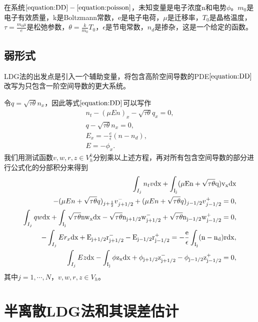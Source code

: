 \documentclass[lang=cn,newtx,10pt,scheme=chinese]{elegantbook}
\begin{document}
在系统$\ref{equation:DD}-\ref{equation:poisson}$，未知变量是电子浓度n和电势$\phi$。$m_0$是电子有效质量，k是Boltzmann常数，e是电子电荷，$\mu$是迁移率，$T_0$是晶格温度，$\tau = \frac{m_0 \mu}{e}$是松弛参数，$\theta = \frac{k}{m_0}T_0$，$\epsilon$是节电常数，$n_d$是掺杂，这是一个给定的函数。
\section{弱形式}
LDG法的出发点是引入一个辅助变量，将包含高阶空间导数的PDE$\ref{equation:DD}$改写为只包含一阶空间导数的更大系统。

令$q = \sqrt{\tau \theta }n_x$，因此等式$\ref{equation:DD}$可以写作
\begin{align}
    n_t - (\mu E n)_x - \sqrt{\tau \theta}q_x = 0, \\
    q - \sqrt{\tau \theta}n_x = 0,                 \\
    E_x = -\frac{e}{\epsilon}(n - n_d),            \\
    E = - \phi_x.
\end{align}
我们用测试函数$v,w,r,z \in V_h^k$分别乘以上述方程，再对所有包含空间导数的部分进行公式化的分部积分来得到
\begin{align}
    \int_{I_j} n_t v \rm{d}x + \int_{I_j}(\mu En + \sqrt{\tau \theta}q)v_x\rm{d} x          \nonumber                                                                             \\
    - (\mu En + \sqrt{\tau \theta}q)_{j+\frac{1}{2}}v_{j+1/2}^- +(\mu En + \sqrt{\tau \theta}q)_{j-1/2}v_{j-1/2}^+ = 0, \label{weakForm:1}                                        \\
    \int_{I_j} qw\rm{d}x + \int_{I_j}\sqrt{\tau \theta} n w_x \rm{d}x - \sqrt{\tau \theta} n_{j+1/2}w_{j+1/2}^- + \sqrt{\tau \theta} n_{j-1/2}w_{j-1/2}^+ = 0, \label{weakForm:2} \\
    -\int_{I_j}Er_x\rm{d}x + E_{j+1/2}r_{j+1/2}^- - E_{j-1/2}r_{j-1/2}^+ = -\frac{e}{\epsilon}\int_{I_j}(n-n_d)r\rm{d}x,                                       \label{weakForm:3} \\
    \int_{I_j} Ez \rm{d}x - \int_{I_j}\phi z_x \rm{d}x + \phi_{j+1/2}z_{j+1/2}^- - \phi_{j-1/2}z_{j-1/2}^+ = 0,\label{weakForm:4}
\end{align}
其中$ j=1,\cdots,N$，$v,w,r,z \in V_h$。
\chapter{半离散LDG法和其误差估计}
\end{document}
